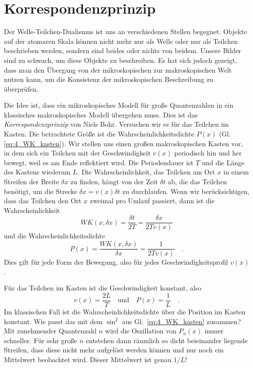 \section{Korrespondenzprinzip}
Der Welle-Teilchen-Dualismus ist uns an verschiedenen Stellen begegnet. Objekte auf der atomaren Skala können nicht mehr nur als Welle oder nur als Teilchen beschrieben werden, sondern sind beides oder nichts von beidem. Unsere Bilder sind zu schwach, um diese Objekte zu beschreiben. Es hat sich jedoch gezeigt, dass man den Übergang von der mikroskopischen zur makroskopischen Welt nutzen kann, um die Konsistenz der mikroskopischen Beschreibung zu überprüfen. 

Die Idee ist, dass ein mikroskopisches Modell für große Quantenzahlen in ein klassisches makroskopisches Modell übergehen muss. Dies ist das \emph{Korrespondenzprinzip} von Niels Bohr. Versuchen wir es für das Teilchen im Kasten. Die betrachtete Größe ist die Wahrscheinlichkeitsdichte $P(x)$ (Gl. \ref{eq:4_WK_kasten}). Wir stellen uns einen großen makroskopischen Kasten vor, in dem sich ein Teilchen mit der Geschwindigkeit $v(x)$ periodisch hin und her bewegt, weil es am Ende reflektiert wird. Die Periodendauer ist $T$ und die Länge des Kastens wiederum $L$. Die Wahrscheinlichkeit, das Teilchen am Ort $x$ in einem Streifen der Breite $\delta x$ zu finden, hängt von der Zeit $\delta t$ ab, die das Teilchen benötigt, um die Strecke $\delta x = v(x) \delta t$ zu durchlaufen. Wenn wir berücksichtigen, dass das Teilchen den Ort $x$ zweimal pro Umlauf passiert, dann ist die Wahrscheinlichkeit
\begin{equation}
    WK(x, \delta x) = \frac{\delta t}{2 T } = \frac{\delta x}{2T v(x)}
\end{equation} 
und die Wahrscheinlichkeitsdichte
\begin{equation}
    P(x) = \frac{WK(x, \delta x)}{\delta x} = \frac{1}{2 T v(x)} \quad .
\end{equation}
Dies gilt für jede Form der Bewegung, also für jedes Geschwindigkeitsprofil $v(x)$.

Für das Teilchen im Kasten ist die Geschwindigkeit konstant, also
\begin{equation}
    v(x) = \frac{2L}{T} \quad \text{und} \quad P(x) = \frac{1}{L} \quad .
\end{equation}
Im klassischen Fall ist die Wahrscheinlichkeitsdichte über die Position im Kasten konstant. Wie passt das mit dem $\sin^2$ aus Gl.~\ref{eq:4_WK_kasten} zusammen? Mit zunehmender Quantenzahl $n$ wird die Oszillation von $P_n(x)$ immer schneller. Für sehr große $n$ entstehen dann räumlich so dicht beieinander liegende Streifen, dass diese nicht mehr aufgelöst werden können und nur noch ein Mittelwert beobachtet wird. Dieser Mittelwert ist genau $1/L$!


